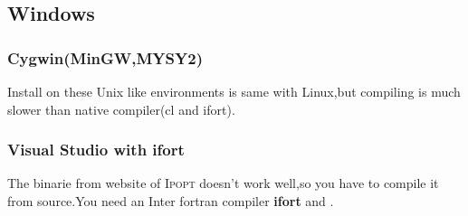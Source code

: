 \documentclass[10pt]{article}
\newcommand{\Ipopt}{\textsc{Ipopt}\xspace}
\begin{document}
 \subsection{Windows}
  \subsubsection{Cygwin(MinGW,MYSY2)}
  Install on these Unix like environments is same with Linux,but compiling is much slower than native compiler(cl and ifort).
  \subsubsection{Visual Studio with ifort}
  The binarie from website of \Ipopt doesn't work well,so you have to compile it from source.You need an Inter fortran compiler \textbf{ifort} and .
\end{document}
